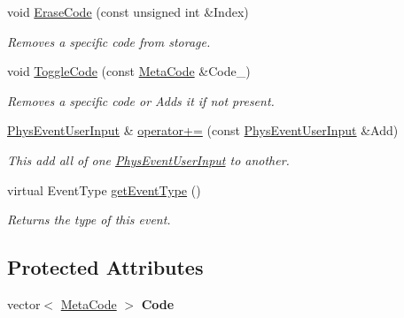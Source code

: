 \begin{DoxyCompactItemize}
void \hyperlink{classPhysEventUserInput_a8cbbee3c2be3bd12746ad442fce526e4}{EraseCode} (const unsigned int \&Index)
\begin{DoxyCompactList}\small\item\em Removes a specific code from storage. \item\end{DoxyCompactList}\item 
void \hyperlink{classPhysEventUserInput_a8325bb0172db6ea02fd06f4a5d1a7378}{ToggleCode} (const \hyperlink{classMetaCode}{MetaCode} \&Code\_\-)
\begin{DoxyCompactList}\small\item\em Removes a specific code or Adds it if not present. \item\end{DoxyCompactList}\item 
\hyperlink{classPhysEventUserInput}{PhysEventUserInput} \& \hyperlink{classPhysEventUserInput_a257c2e093b5736324e39d5fac0d6de2a}{operator+=} (const \hyperlink{classPhysEventUserInput}{PhysEventUserInput} \&Add)
\begin{DoxyCompactList}\small\item\em This add all of one \hyperlink{classPhysEventUserInput}{PhysEventUserInput} to another. \item\end{DoxyCompactList}\item 
virtual EventType \hyperlink{classPhysEventUserInput_ab89b06b8f7aa148cad453ca9fcae5b89}{getEventType} ()
\begin{DoxyCompactList}\small\item\em Returns the type of this event. \item\end{DoxyCompactList}\end{DoxyCompactItemize}
\subsection*{Protected Attributes}
\begin{DoxyCompactItemize}
\item 
\hypertarget{classPhysEventUserInput_a51607772d8a5b9f401ad0efc964ec129}{
vector$<$ \hyperlink{classMetaCode}{MetaCode} $>$ {\bfseries Code}}
\label{dc/d0e/classPhysEventUserInput_a51607772d8a5b9f401ad0efc964ec129}

\end{DoxyCompactItemize}


